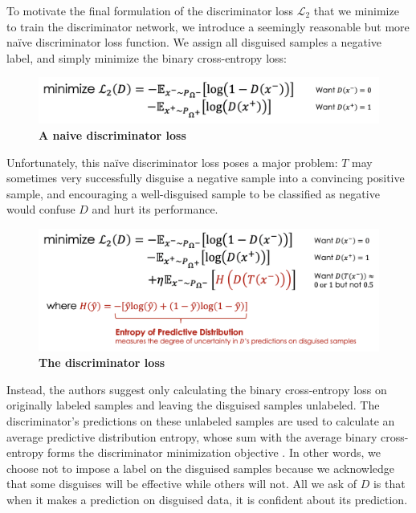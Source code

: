 \documentclass{proc}
\begin{document}
To motivate the final formulation of the discriminator loss $\mathcal{L}_2$ that we minimize to train the discriminator network, we introduce a seemingly reasonable but more na\"ive discriminator loss function. We assign all disguised samples a negative label, and simply minimize the binary cross-entropy loss:

\begin{figure}[h!]
		\includegraphics*[scale=0.23]{../figures/discriminator-loss-naive.png}
		\caption{\textbf{A naive discriminator loss}}
		\label{fig:discriminator-loss-naive}
\end{figure}

Unfortunately, this na\"ive discriminator loss poses a major problem: $T$ may sometimes very successfully disguise a negative sample into a convincing positive sample, and encouraging a well-disguised sample to be classified as negative would confuse $D$ and hurt its performance.

\begin{figure}[h!]
		\includegraphics*[scale=0.24]{../figures/discriminator-loss.png}
		\caption{\textbf{The discriminator loss}}
		\label{fig:discriminator-loss}
\end{figure}

Instead, the authors suggest only calculating the binary cross-entropy loss on originally labeled samples and leaving the disguised samples unlabeled. The discriminator's predictions on these unlabeled samples are used to calculate an average predictive distribution entropy, whose sum with the average binary cross-entropy forms the discriminator minimization objective \cite{DAN}. In other words, we choose not to impose a label on the disguised samples because we acknowledge that some disguises will be effective while others will not. All we ask of $D$ is that when it makes a prediction on disguised data, it is confident about its prediction.
\end{document}
